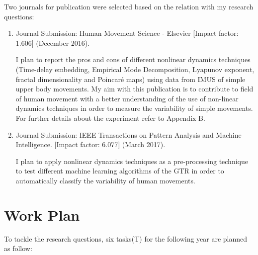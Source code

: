 \documentclass[9pt,journal,onecolumn,compsoc]{IEEEtran}
\begin{document}
Two journals for publication 
were selected based on the relation with my research questions:


\begin{enumerate}
 \item Journal Submission: Human Movement Science - Elsevier [Impact factor: 1.606] (December 2016).
 
I plan to report the pros and cons of different nonlinear dynamics techniques 
(Time-delay embedding, Empirical Mode Decomposition, Lyapunov exponent, fractal dimensionality and Poincaré maps)
using data from IMUS of simple upper body movements.
My aim with this publication is to contribute to field of human movement 
with a better understanding of the use of non-linear dynamics techniques 
in order to measure the variability of simple movements. 
For further details about the experiment refer to Appendix B.


\item Journal Submission: IEEE Transactions on Pattern Analysis and Machine Intelligence.
[Impact factor: 6.077] (March 2017).

I plan to apply nonlinear dynamics techniques as a pre-processing technique 
to test different machine learning algorithms of the GTR in order 
to automatically classify the variability of human movements. 

\end{enumerate}




\section{Work Plan} 
To tackle the research questions,
six tasks(T) for the following year are planned as follow:
\end{document}
